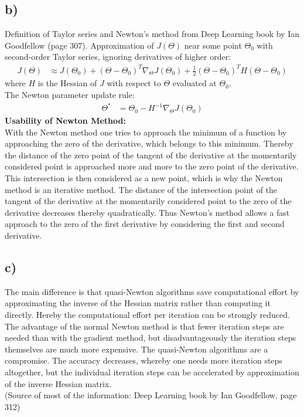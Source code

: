 \documentclass[a4paper]{article}
\begin{document}
    \subsection*{b)}
        Definition of Taylor series and Newton's method from Deep Learning book by Ian Goodfellow (page 307).
        Approximation of $J(\Theta)$ near some point $\Theta_0$ with second-order Taylor series, ignoring derivatives of higher order:
        \begin{align}
            J(\Theta) &\approx J(\Theta_0) + (\Theta - \Theta_0)^T \nabla_{\Theta} J(\Theta_0) + \frac{1}{2} (\Theta - \Theta_0)^T H(\Theta - \Theta_0)
        \end{align}
        where $H$ is the Hessian of $J$ with respect to $\Theta$ evaluated at $\Theta_0$.\\
        The Newton parameter update rule:
        \begin{align}
            \Theta^* &= \Theta_0 - H^{-1} \nabla_{\Theta} J(\Theta_0)
        \end{align}
        \textbf{Usability of Newton Method:}\\
        With the Newton method one tries to approach the minimum of a function by approaching the zero of the derivative, which belongs to this minimum.
        Thereby the distance of the zero point of the tangent of the derivative at the momentarily considered point is approached more and more to the zero point of the derivative.
        This intersection is then considered as a new point, which is why the Newton method is an iterative method.
        The distance of the intersection point of the tangent of the derivative at the momentarily considered point to the zero of the derivative decreases thereby quadratically.
        Thus Newton's method allows a fast approach to the zero of the first derivative by considering the first and second derivative.

    
    \subsection*{c)}
        The main difference is that quasi-Newton algorithms save computational effort by approximating the inverse of the Hessian matrix rather than computing it directly.
        Hereby the computational effort per iteration can be strongly reduced.
        The advantage of the normal Newton method is that fewer iteration steps are needed than with the gradient method, but disadvantageously the iteration steps themselves are much more expensive.
        The quasi-Newton algorithms are a compromise.
        The accuracy decreases, whereby one needs more iteration steps altogether, but the individual iteration steps can be accelerated by approximation of the inverse Hessian matrix.\\
        (Source of most of the information: Deep Learning book by Ian Goodfellow, page 312)
\end{document}
